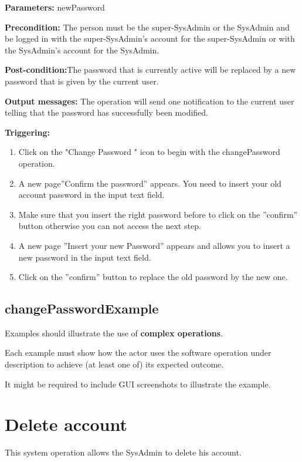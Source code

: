 \begin{description}

\item \textbf{Parameters:} newPassword
\item \textbf{Precondition:} The person must be the super-SysAdmin or the
SysAdmin and be logged in with the super-SysAdmin's account for the
super-SysAdmin or with the SysAdmin's account for the SysAdmin.
\item \textbf{Post-condition:}The password that is currently active will be
replaced by a new password that is given by the current user.
\item \textbf{Output messages:} The operation will send one notification to the
current user telling that the password  has successfully been modified.


\item \textbf{Triggering:}
\begin{enumerate}
\item Click on the "Change Password " icon to begin with the changePassword
operation.
\item A new page''Confirm the password'' appears. You need to insert your old
account password in the input text field. 
\item Make sure that you insert the right password before to click on the
''confirm'' button otherwise you can not access the next step.
\item A new page ''Insert your new Password'' appears and allows you to
insert a new password in the input text field.
\item Click on the ''confirm'' button to replace the old password by the new
one.

\end{enumerate}

 
\end{description}

 
\subsection{changePasswordExample}
Examples should illustrate the use of \textbf{complex operations}.

Each example must show how the actor uses the software operation under
description to achieve (at least one of) its expected outcome.

It might be required to include GUI screenshots to illustrate the example.




\section{Delete account}
\label{operation:deletAccount}
This system operation allows the SysAdmin to delete his account.

